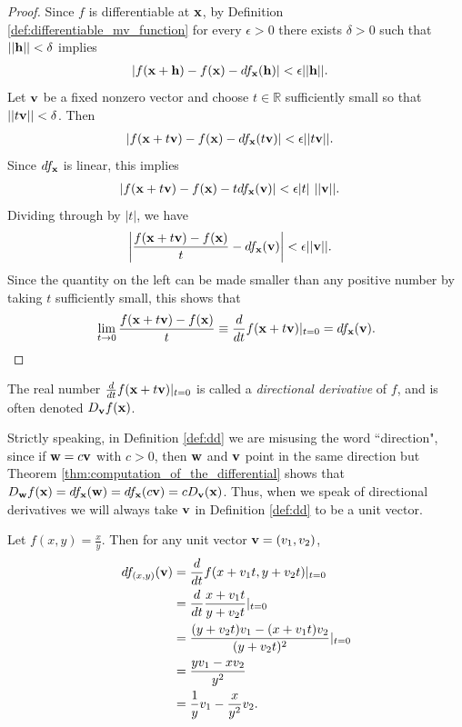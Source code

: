 \documentclass[12pt,letterpaper,reqno]{article}
\numberwithin{equation}{section}
\newcommand{\bh}{{\bf h}}
\newcommand{\R}{\ensuremath{\mathbb R}}
\newcommand{\bv}{{\bf v}}
\newcommand{\bw}{{\bf w}}
\newcommand{\bx}{{\bf x}}
\begin{document}
{\begin{proof}
	Since $f$ is differentiable at $\bx$, by Definition \ref{def:differentiable_mv_function} for every $\epsilon>0$ there exists $\delta>0$ such that $||\bh||<\delta$ implies
	\begin{align*}
		|f(\bx+\bh)-f(\bx)-df_\bx(\bh)|&<\epsilon ||\bh||.
	\end{align*}
	Let $\bv$ be a fixed nonzero vector and choose $t \in \R$ sufficiently small so that $||t \bv||<\delta$. Then 
	\begin{align*}
		|f(\bx+t\bv)-f(\bx)-df_\bx(t\bv)|&<\epsilon ||t\bv||.
	\end{align*} 
	Since $df_\bx$ is linear, this implies
	\begin{align*}
				|f(\bx+t\bv)-f(\bx)-t df_\bx(\bv)|&<\epsilon |t| \ ||\bv||.
	\end{align*}
	Dividing through by $|t|$, we have
	\begin{align*}
		\left|\frac{f(\bx+t\bv)-f(\bx)}{t}-df_\bx(\bv)\right|&<\epsilon||\bv||.
	\end{align*}
	Since the quantity on the left can be made smaller than any positive number by taking $t$ sufficiently small, this shows that
	\begin{align*}
		\lim_{t \to 0}\frac{f(\bx+t\bv)-f(\bx)}{t}\equiv \frac{d}{dt}f(\bx+t\bv)|_{t=0}=df_\bx(\bv).
	\end{align*}
\end{proof}

\begin{defn}\label{def:dd}
The real number	$\frac{d}{dt}f(\bx+t\bv)|_{t=0}$ is called a \emph{directional derivative} of $f$, and is often denoted $D_\bv f(\bx)$. 
\end{defn}

\begin{remark}
	Strictly speaking, in Definition \ref{def:dd} we are misusing the word ``direction", since if $\bw=c\bv$ with $c>0$, then $\bw$ and $\bv$ point in the same direction but Theorem \ref{thm:computation_of_the_differential} shows that $D_\bw f(\bx)=df_\bx(\bw)=df_\bx(c\bv)=cD_\bv(\bx)$. Thus, when we speak of directional derivatives we will always take $\bv$ in Definition \ref{def:dd} to be a unit vector.
\end{remark}

\begin{example}
Let $f(x,y)=\frac{x}{y}$. Then for any unit vector $\bv=(v_1,v_2)$,
\begin{align*}
	df_{(x,y)}(\bv)&=\frac{d}{dt}f(x+v_1t,y+v_2t)|_{t=0} \\
	&=\frac{d}{dt}\frac{x+v_1t}{y+v_2t}|_{t=0} \\
	&=\frac{(y+v_2t)v_1-(x+v_1t)v_2}{(y+v_2t)^2}|_{t=0}\\
	&=\frac{yv_1-xv_2}{y^2} \\
	&=\frac{1}{y}v_1-\frac{x}{y^2}v_2.
\end{align*}	
\end{example}


}
\end{document}
